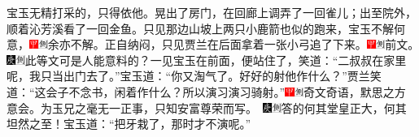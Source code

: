 宝玉无精打采的，只得依他。晃出了房门，在回廊上调弄了一回雀儿；出至院外，顺着沁芳溪看了一回金鱼。只见那边山坡上两只小鹿箭也似的跑来，宝玉不解何意，{\includegraphics[width=3mm]{../Images/00002}\includegraphics[width=3mm]{../Images/00011}\footnotesize \kaishu 余亦不解。}正自纳闷，只见贾兰在后面拿着一张小弓追了下来。{\includegraphics[width=3mm]{../Images/00002}\includegraphics[width=3mm]{../Images/00011}\footnotesize \kaishu 前文。　\includegraphics[width=3mm]{../Images/00004}\includegraphics[width=3mm]{../Images/00011}\footnotesize \kaishu 此等文可是人能意料的？}一见宝玉在前面，便站住了，笑道：“二叔叔在家里呢，我只当出门去了。”宝玉道：“你又淘气了。好好的射他作什么？”贾兰笑道：“这会子不念书，闲着作什么？所以演习演习骑射。”{\includegraphics[width=3mm]{../Images/00002}\includegraphics[width=3mm]{../Images/00011}\footnotesize \kaishu 奇文奇语，默思之方意会。为玉兄之毫无一正事，只知安富尊荣而写。　\includegraphics[width=3mm]{../Images/00004}\includegraphics[width=3mm]{../Images/00011}\footnotesize \kaishu 答的何其堂皇正大，何其坦然之至！}宝玉道：“把牙栽了，那时才不演呢。”

